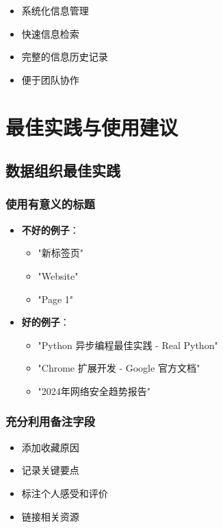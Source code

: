 \documentclass[10pt,a4paper]{article}
\newcommand{\subtitle}[1]{%
  \vspace{3pt}
  \noindent{\textbf{#1}}
}
\begin{document}
\begin{itemize}
\begin{itemize}
\begin{itemize}
\begin{itemize}
\begin{enumerate}
\begin{itemize}
\subtitle{获得的收益}
\begin{itemize}
  \item 系统化信息管理
  \item 快速信息检索
  \item 完整的信息历史记录
  \item 便于团队协作
\end{itemize}

\vspace{5pt}

\section{最佳实践与使用建议}

\subsection{数据组织最佳实践}

\subsubsection{使用有意义的标题}
\begin{itemize}
  \item \textbf{不好的例子}：
    \begin{itemize}
      \item "新标签页"
      \item "Website"
      \item "Page 1"
    \end{itemize}
  \item \textbf{好的例子}：
    \begin{itemize}
      \item "Python 异步编程最佳实践 - Real Python"
      \item "Chrome 扩展开发 - Google 官方文档"
      \item "2024年网络安全趋势报告"
    \end{itemize}
\end{itemize}

\subsubsection{充分利用备注字段}
\begin{itemize}
  \item 添加收藏原因
  \item 记录关键要点
  \item 标注个人感受和评价
  \item 链接相关资源
\end{itemize}


\end{itemize}
\end{enumerate}
\end{itemize}
\end{itemize}
\end{itemize}
\end{itemize}
\end{document}
